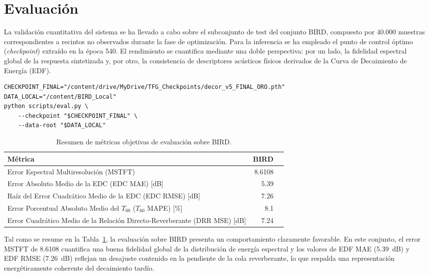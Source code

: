 \section{Evaluación}

La validación cuantitativa del sistema se ha llevado a cabo sobre el subconjunto de test del conjunto BIRD, compuesto por 40.000 muestras correspondientes a recintos no observados durante la fase de optimización. Para la inferencia se ha empleado el punto de control óptimo (\textit{checkpoint}) extraído en la época 540. El rendimiento se cuantifica mediante una doble perspectiva: por un lado, la fidelidad espectral global de la respuesta sintetizada y, por otro, la consistencia de descriptores acústicos físicos derivados de la Curva de Decaimiento de Energía (EDF).

\begin{lstlisting}[style=pythoncell,caption={Ejecución de la evaluación cuantitativa sobre el conjunto de test/validación.},label={lst:eval_run}]
CHECKPOINT_FINAL="/content/drive/MyDrive/TFG_Checkpoints/decor_v5_FINAL_ORO.pth"
DATA_LOCAL="/content/BIRD_Local"
python scripts/eval.py \
	--checkpoint "$CHECKPOINT_FINAL" \
	--data-root "$DATA_LOCAL"
\end{lstlisting}

\begin{table}[htbp]
\centering
\small
\setlength{\tabcolsep}{6pt}
\begin{tabular}{p{}rr}
\toprule
\textbf{Métrica} & \textbf{BIRD} \\
\midrule
Error Espectral Multiresolución (MSTFT) & 8.6108 \\
Error Absoluto Medio de la EDC (EDC MAE) [dB] & 5.39 \\
Raíz del Error Cuadrático Medio de la EDC (EDC RMSE) [dB] & 7.26 \\
Error Porcentual Absoluto Medio del $T_{60}$ ($T_{60}$ MAPE) [\%] & 8.1 \\
Error Cuadrático Medio de la Relación Directo-Reverberante (DRR MSE) [dB] & 7.24 \\
\bottomrule
\end{tabular}
\caption{Resumen de métricas objetivas de evaluación sobre BIRD.}
\label{tab:eval_comparativa_datasets}
\end{table}

Tal como se resume en la Tabla~\ref{tab:eval_comparativa_datasets}, la evaluación sobre BIRD presenta un comportamiento claramente favorable. En este conjunto, el error MSTFT de 8.6108 cuantifica una buena fidelidad global de la distribución de energía espectral y los valores de EDF MAE (5.39~dB) y EDF RMSE (7.26~dB) reflejan un desajuste contenido en la pendiente de la cola reverberante, lo que respalda una representación energéticamente coherente del decaimiento tardío.

